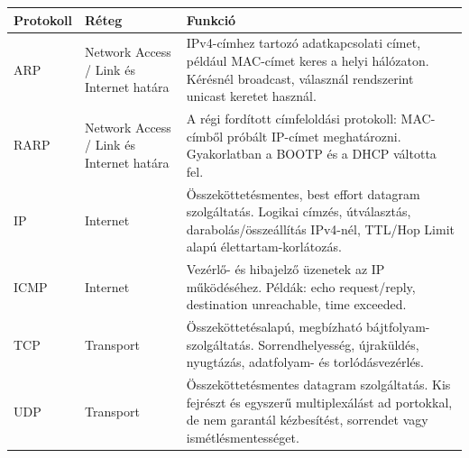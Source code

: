 \begin{tabularx}{\textwidth}{L{19mm}L{25mm}X}
\toprule
\textbf{Protokoll} & \textbf{Réteg} & \textbf{Funkció} \\
\midrule
ARP & Network Access / Link és Internet határa & IPv4-címhez tartozó adatkapcsolati címet, például MAC-címet keres a helyi hálózaton. Kérésnél broadcast, válasznál rendszerint unicast keretet használ. \\
RARP & Network Access / Link és Internet határa & A régi fordított címfeloldási protokoll: MAC-címből próbált IP-címet meghatározni. Gyakorlatban a BOOTP és a DHCP váltotta fel. \\
IP & Internet & Összeköttetésmentes, best effort datagram szolgáltatás. Logikai címzés, útválasztás, darabolás/összeállítás IPv4-nél, TTL/Hop Limit alapú élettartam-korlátozás. \\
ICMP & Internet & Vezérlő- és hibajelző üzenetek az IP működéséhez. Példák: echo request/reply, destination unreachable, time exceeded. \\
TCP & Transport & Összeköttetésalapú, megbízható bájtfolyam-szolgáltatás. Sorrendhelyesség, újraküldés, nyugtázás, adatfolyam- és torlódásvezérlés. \\
UDP & Transport & Összeköttetésmentes datagram szolgáltatás. Kis fejrészt és egyszerű multiplexálást ad portokkal, de nem garantál kézbesítést, sorrendet vagy ismétlésmentességet. \\
\bottomrule
\end{tabularx}
